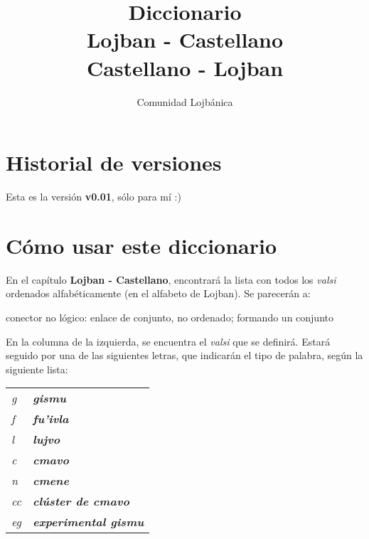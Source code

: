 \documentclass[ipa,twoside]{report}
\author{Comunidad Lojbánica}
\title{Diccionario\\Lojban - Castellano\\Castellano - Lojban}
\begin{document}
\def\/{\discretionary{.}{}{.}}


\setlength{\leftfield}{0.1\textwidth}
\setlength{\rightfield}{0.3\textwidth}

\maketitle

\tableofcontents

\chapter*{Historial de versiones}
\label{cha:historial}
Esta es la versión {\bfseries v0.01}, sólo para mí :)

\chapter*{Cómo usar este diccionario}
\label{cha:howto}
En el capítulo \textbf{Lojban - Castellano}, encontrará la lista con todos los \textsl{valsi} ordenados alfabéticamente (en el alfabeto de Lojban). Se parecerán a:

\begin{center}
\begin{minipage}[t]{0.55\textwidth}
 	{}{}{}{conector no lógico: enlace de conjunto, no ordenado; formando un conjunto}
\end{minipage}
\end{center}

En la columna de la izquierda, se encuentra el \textsl{valsi} que se definirá. Estará seguido por una de las siguientes letras, que indicarán el tipo de palabra, según la siguiente lista:

\begin{tabular}{ l l }
  \textit{g} & \textbf{\emph{gismu}}  \\
  \textit{f} & \textbf{\emph{fu'ivla}}  \\
  \textit{l} & \textbf{\emph{lujvo}}  \\
  \textit{c} & \textbf{\emph{cmavo}} \\
  \textit{n} & \textbf{\emph{cmene}} \\
  \textit{cc} & \textbf{\emph{clúster de cmavo}} \\
  \textit{eg} & \textbf{\emph{experimental gismu}} \\
\end{tabular}
\end{document}
